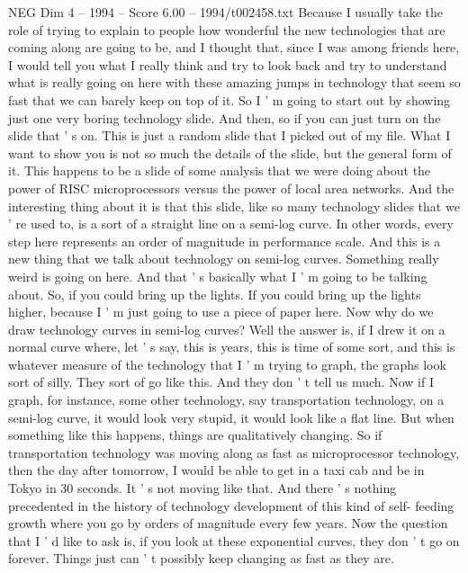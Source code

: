 \begin{textsample}{NEG Dim 4 – 1994 – Score 6.00 – 1994/t002458.txt}  \label{ex:f4_neg_017}
Because I usually take the role of trying to explain to people how wonderful the new technologies that are coming along are going to be, and I thought that, since I was among friends here, I would tell you what I really think and try to look back and try to understand what is really going on here with these amazing jumps in technology that seem so fast that we can barely keep on top of it.
So I ' m going to start out by showing just one very boring technology slide.
And then, so if you can just turn on the slide that ' s on.
This is just a random slide that I picked out of my file.
What I want to show you is not so much the details of the slide, but the general form of it.
This happens to be a slide of some analysis that we were doing about the power of RISC microprocessors versus the power of local area networks.
And the interesting thing about it is that this slide, like so many technology slides that we ' re used to, is a sort of a straight line on a semi-log curve.
In other words, every step here represents an order of magnitude in performance scale.
And this is a new thing that we talk about technology on semi-log curves.
Something really weird is going on here.
And that ' s basically what I ' m going to be talking about.
So, if you could bring up the lights.
If you could bring up the lights higher, because I ' m just going to use a piece of paper here.
Now why do we draw technology curves in semi-log curves?
Well the answer is, if I drew it on a normal curve where, let ' s say, this is years, this is time of some sort, and this is whatever measure of the technology that I ' m trying to graph, the graphs look sort of silly.
They sort of go like this.
And they don ' t tell us much.
Now if I graph, for instance, some other technology, say transportation technology, on a semi-log curve, it would look very stupid, it would look like a flat line.
But when something like this happens, things are qualitatively changing.
So if transportation technology was moving along as fast as microprocessor technology, then the day after tomorrow, I would be able to get in a taxi cab and be in Tokyo in 30 seconds.
It ' s not moving like that.
And there ' s nothing precedented in the history of technology development of this kind of self- feeding growth where you go by orders of magnitude every few years.
Now the question that I ' d like to ask is, if you look at these exponential curves, they don ' t go on forever.
Things just can ' t possibly keep changing as fast as they are.

\end{textsample}
